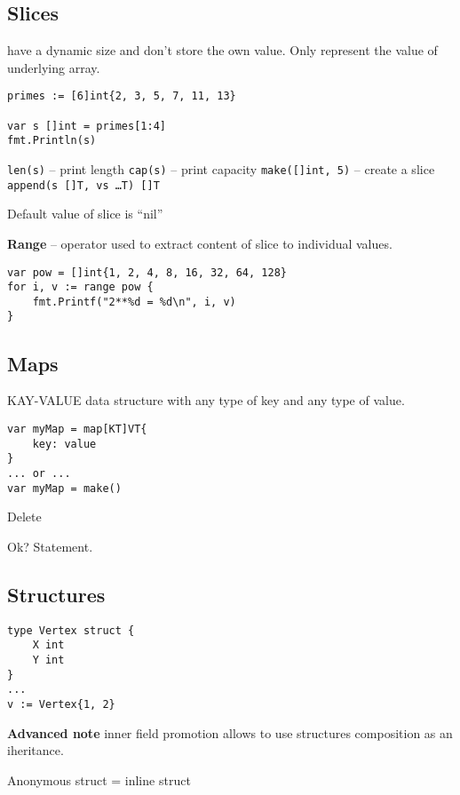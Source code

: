 \documentclass[12pt]{article}
\begin{document}
\subsection{Slices} have a dynamic size and don't store the own value.
Only represent the value of underlying array.

\begin{lstlisting}
primes := [6]int{2, 3, 5, 7, 11, 13}

var s []int = primes[1:4]
fmt.Println(s)
\end{lstlisting}

\texttt{len(s)} -- print length
\texttt{cap(s)} -- print capacity
\texttt{make([]int, 5)} -- create a slice
\texttt{append(s []T, vs \ldots T) []T}

Default value of slice is ``nil''

\textbf{Range} -- operator used to extract content of slice to individual values.

\begin{lstlisting}
var pow = []int{1, 2, 4, 8, 16, 32, 64, 128}
for i, v := range pow {
    fmt.Printf("2**%d = %d\n", i, v)
}
\end{lstlisting}

\subsection[maps]{Maps}
KAY-VALUE data structure with any type of key and any type of value.
\begin{lstlisting}
var myMap = map[KT]VT{
    key: value
}
... or ...
var myMap = make()
\end{lstlisting}

Delete

Ok? Statement.

\subsection{Structures}

\begin{lstlisting}
type Vertex struct {
    X int
    Y int
}
...
v := Vertex{1, 2}
\end{lstlisting}

\begin{Note} \textbf{Advanced note}
inner field promotion allows to use structures composition as an iheritance.
\end{Note}

Anonymous struct = inline struct

\newpage
\end{document}
